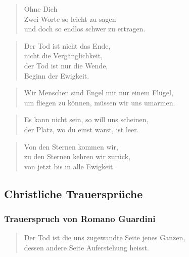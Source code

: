 \documentclass[ngerman,a4paper,11pt]{scrreprt}
\begin{document}
\begin{verse}
Ohne Dich \\
Zwei Worte so leicht zu sagen \\
und doch so endlos schwer zu ertragen. \\
\end{verse}

\begin{verse}
Der Tod ist nicht das Ende, \\
nicht die Vergänglichkeit, \\
der Tod ist nur die Wende, \\
Beginn der Ewigkeit. \\
\end{verse}

\begin{verse}
Wir Menschen sind Engel mit nur einem Flügel, \\
um fliegen zu können, müssen wir uns umarmen. \\
\end{verse}

\begin{verse}
Es kann nicht sein, so will uns scheinen, \\
der Platz, wo du einst warst, ist leer. \\
\end{verse}

\begin{verse}
Von den Sternen kommen wir, \\
zu den Sternen kehren wir zurück, \\
von jetzt bis in alle Ewigkeit. \\
\end{verse}

\clearpage

\subsection{Christliche Trauersprüche}
\label{sec-2-1-2-2}

\subsubsection*{Trauerspruch von Romano Guardini}
\label{sec-2-1-2-2-1}

\begin{verse}
Der Tod ist die uns zugewandte Seite jenes Ganzen, \\
dessen andere Seite Auferstehung heisst. \\
\end{verse}
\end{document}
